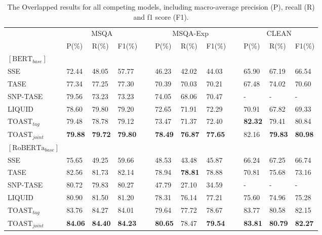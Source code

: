 \documentclass[a4paper]{cas-sc}
\newcommand{\1}[1]{\mathds{1}\left[#1\right]}
\begin{document}
\begin{table}[width=\textwidth,cols=4,pos=h]
	\caption{The Overlapped results for all competing models, including macro-average precision (P), recall (R) and f1 score (F1). }
	\label{tab:overlapped}
	\begin{tabular*}{\tblwidth}{@{}p{2.2cm}p{1.0cm}p{1.0cm}p{1.0cm}cp{1.0cm}p{1.0cm}p{1.0cm}cp{1.0cm}p{1.0cm}p{1.0cm}@{}}
		\toprule[0.3mm]
		\multicolumn{1}{l}{}  & \multicolumn{3}{c}{MSQA}  & \multicolumn{1}{l}{}  & \multicolumn{3}{c}{MSQA-Exp} & \multicolumn{1}{l}{} & \multicolumn{3}{c}{CLEAN} \\ 
		\cline{2-4} \cline{6-8} \cline{10-12}
		\addlinespace
		& P(\%)  & R(\%)  & F1(\%)  &  ~& P(\%)    & R(\%)   & F1(\%)  & ~ & P(\%)   & R(\%)  & F1(\%)  \\
		\toprule
		$\left[\text{BERT}_{base}\right]$ & & & & & & & & & \\ \midrule
		SSE                   & 72.44  &48.05 & 57.77 & & 46.23    & 42.02   & 44.03  & & 65.90   & 67.19  & 66.54  \\
		TASE                  & 77.34 & 77.25  & 77.30 & & 70.39   & 70.03   & 70.21  & & 67.48   & 74.02  & 70.60  \\
		SNP-TASE           &  79.56  & 73.23 & 73.23  & & 74.05    & 68.06   & 70.47 &   & -   & -  & - \\
		LIQUID   & 78.60 & 79.80 & 79.20  & & 72.65  & 71.91  & 72.29 &  & 70.91  & 67.82  & 69.33  \\
		$\text{TOAST}_{tag}$          & 79.48 &  78.78  &  79.12 &  & 73.47    & 71.37   & 72.40 &  & \textbf{82.32}   & 79.41  & 80.84  \\
		$\text{TOAST}_{joint}$        & \textbf{79.88}& \textbf{79.72}  & \textbf{79.80}  & & \textbf{78.49}    & \textbf{76.87}   & \textbf{77.65}   & & 82.16   & \textbf{79.83}  & \textbf{80.98}  \\ 
		\toprule[0.25mm]
		$\left[\text{RoBERTa}_{base}\right]$ & & & & & & & & & & & \\ \midrule
		SSE              & 75.65  & 49.25  & 59.66  & & 48.53    &  43.48   & 45.87   & & 66.24  & 67.25  & 66.74 \\
		TASE                & 82.56    & 81.73   & 82.14  & & 78.94    & \textbf{78.81  } & 78.88 &  & 70.81  & 75.68  & 73.16  \\
		SNP-TASE              & 80.72  & 79.83  & 80.27  & & 47.79    & 27.10   & 34.59   & & -   & -  & -  \\
		LIQUID  & 80.90  & 81.50  & 81.20  & &  78.31   & 76.14  & 77.21  & & 75.60  & 74.96  &  75.28  \\
		$\text{TOAST}_{tag}$            & 83.76  & 84.27  & 84.01  & & 79.64   & 77.72   & 78.67  & & 83.77   & 80.58  & 82.15  \\
		$\text{TOAST}_{joint}$    & \textbf{84.06}  & \textbf{84.40}  & \textbf{84.23}  & & \textbf{80.65}    & 78.47  & \textbf{79.54}  & & \textbf{83.81}  & \textbf{80.79}  & \textbf{82.27}  \\ 
		\bottomrule[0.25mm]
	\end{tabular*}
\end{table}
\end{document}
